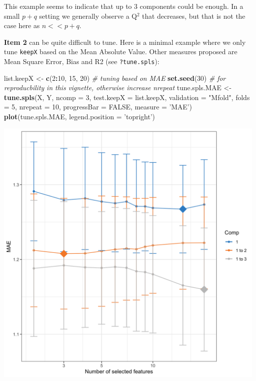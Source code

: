 \documentclass[]{book}
\newenvironment{Shaded}{\begin{snugshade}}{\end{snugshade}}
\newcommand{\CommentTok}[1]{\textcolor[rgb]{0.56,0.35,0.01}{\textit{#1}}}
\newcommand{\DataTypeTok}[1]{\textcolor[rgb]{0.13,0.29,0.53}{#1}}
\newcommand{\DecValTok}[1]{\textcolor[rgb]{0.00,0.00,0.81}{#1}}
\newcommand{\KeywordTok}[1]{\textcolor[rgb]{0.13,0.29,0.53}{\textbf{#1}}}
\newcommand{\NormalTok}[1]{#1}
\newcommand{\OperatorTok}[1]{\textcolor[rgb]{0.81,0.36,0.00}{\textbf{#1}}}
\newcommand{\OtherTok}[1]{\textcolor[rgb]{0.56,0.35,0.01}{#1}}
\newcommand{\StringTok}[1]{\textcolor[rgb]{0.31,0.60,0.02}{#1}}
\begin{document}
This example seems to indicate that up to 3 components could be enough. In a small \(p+q\) setting we generally observe a Q\(^2\) that decreases, but that is not the case here as \(n << p+q\).

\textbf{Item 2} can be quite difficult to tune. Here is a minimal example where we only tune \texttt{keepX} based on the Mean Absolute Value. Other measures proposed are Mean Square Error, Bias and R2 (see \texttt{?tune.spls}):

\begin{Shaded}
\begin{Highlighting}[]
\NormalTok{list.keepX <-}\StringTok{ }\KeywordTok{c}\NormalTok{(}\DecValTok{2}\OperatorTok{:}\DecValTok{10}\NormalTok{, }\DecValTok{15}\NormalTok{, }\DecValTok{20}\NormalTok{)}
\CommentTok{# tuning based on MAE}
\KeywordTok{set.seed}\NormalTok{(}\DecValTok{30}\NormalTok{) }\CommentTok{# for reproducbility in this vignette, otherwise increase nrepeat}
\NormalTok{tune.spls.MAE <-}\StringTok{ }\KeywordTok{tune.spls}\NormalTok{(X, Y, }\DataTypeTok{ncomp =} \DecValTok{3}\NormalTok{,}
                           \DataTypeTok{test.keepX =}\NormalTok{ list.keepX,}
                           \DataTypeTok{validation =} \StringTok{"Mfold"}\NormalTok{, }\DataTypeTok{folds =} \DecValTok{5}\NormalTok{,}
                           \DataTypeTok{nrepeat =} \DecValTok{10}\NormalTok{, }\DataTypeTok{progressBar =} \OtherTok{FALSE}\NormalTok{,}
                           \DataTypeTok{measure =} \StringTok{'MAE'}\NormalTok{)}
\KeywordTok{plot}\NormalTok{(tune.spls.MAE, }\DataTypeTok{legend.position =} \StringTok{'topright'}\NormalTok{)}
\end{Highlighting}
\end{Shaded}

\begin{center}\includegraphics[width=0.75\linewidth,]{Figures/05-pls-tune-1} \end{center}
\end{document}
